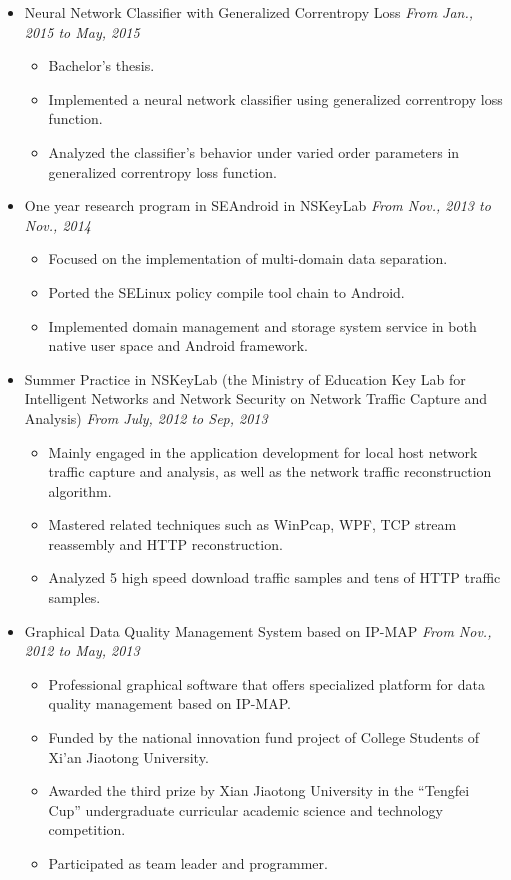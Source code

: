 \documentclass[a4paper,11pt]{article}
\begin{document}
\begin{itemize}
    \item Neural Network Classifier with Generalized Correntropy Loss \hfill \textit{From Jan., 2015 to
May, 2015}
    \begin{itemize}
        \item Bachelor's thesis.
        \item Implemented a neural network classifier using generalized correntropy loss function.
        \item Analyzed the classifier's behavior under varied order parameters in generalized correntropy loss
function.
    \end{itemize}

    \item One year research program in SEAndroid in NSKeyLab \hfill \textit{From Nov., 2013 to Nov., 2014}
    \begin{itemize}
        \item Focused on the implementation of multi-domain data separation.
        \item Ported the SELinux policy compile tool chain to Android.
        \item Implemented domain management and storage system service in both native user space and Android
framework.
    \end{itemize}

    \item Summer Practice in NSKeyLab (the Ministry of Education Key Lab for Intelligent Networks and Network
    Security on Network Traffic Capture and Analysis) \hfill \textit{From July, 2012 to Sep, 2013}
    \begin{itemize}
        \item Mainly engaged in the application development for local host network traffic capture and
analysis, as well as the network traffic reconstruction algorithm.
        \item Mastered related techniques such as WinPcap, WPF, TCP stream reassembly and HTTP reconstruction.
        \item Analyzed 5 high speed download traffic samples and tens of HTTP traffic samples.
    \end{itemize}

    \item Graphical Data Quality Management System based on IP-MAP \hfill \textit{From Nov., 2012 to May,
2013}
    \begin{itemize}
        \item Professional graphical software that offers specialized platform for data quality management based on IP-MAP.
        \item Funded by the national innovation fund project of College Students of Xi’an Jiaotong University.
        \item Awarded the third prize by Xian Jiaotong University in the “Tengfei Cup” undergraduate
curricular academic science and technology competition.
        \item Participated as team leader and programmer.
    \end{itemize}
\end{itemize}
\end{document}
